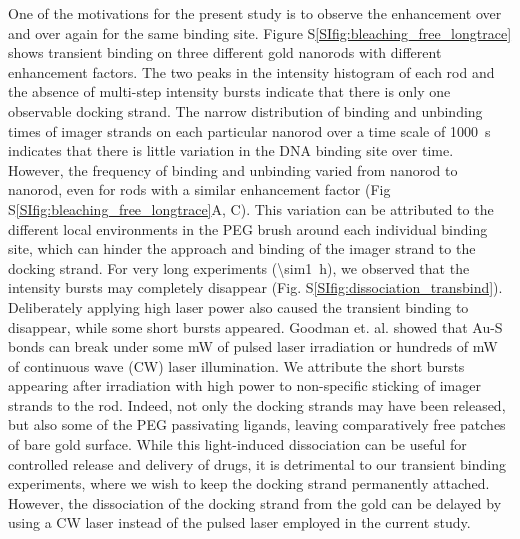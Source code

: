 One of the motivations for the present study is to observe the enhancement over and over again for the same binding site.
Figure S\ref{SIfig:bleaching_free_longtrace} shows transient binding on three different gold nanorods with different enhancement factors.
The two peaks in the intensity histogram of each rod and the absence of multi-step intensity bursts indicate that there is only one observable docking strand.
The narrow distribution of binding and unbinding times of imager strands on each particular nanorod over a time scale of \SI{1000}{\s} indicates that there is little variation in the DNA binding site over time.
However, the frequency of binding and unbinding varied from nanorod to nanorod, even for rods with a similar enhancement factor (Fig S\ref{SIfig:bleaching_free_longtrace}A, C).
This variation can be attributed to the different local environments in the PEG brush around each individual binding site, which can hinder the approach and binding of the imager strand to the docking strand.
For very long experiments (\SI{\sim1}{\hour}), we observed that the intensity bursts may completely disappear (Fig. S\ref{SIfig:dissociation_transbind}).
Deliberately applying high laser power also caused the transient binding to disappear, while some short bursts appeared.
Goodman et. al.\cite{goodman2016understanding} showed that Au-S bonds can break under some mW of pulsed laser irradiation or hundreds of mW of continuous wave (CW) laser illumination.
We attribute the short bursts appearing after irradiation with high power to non-specific sticking of imager strands to the rod. Indeed, not only the docking strands may have been released, but also some of the PEG passivating ligands, leaving comparatively free patches of bare gold surface.
While this light-induced dissociation can be useful for controlled release and delivery of drugs, it is detrimental to our transient binding experiments, where we wish to keep the docking strand permanently attached.
However, the dissociation of the docking strand from the gold can be delayed by using a CW laser instead of the pulsed laser employed in the current study.



